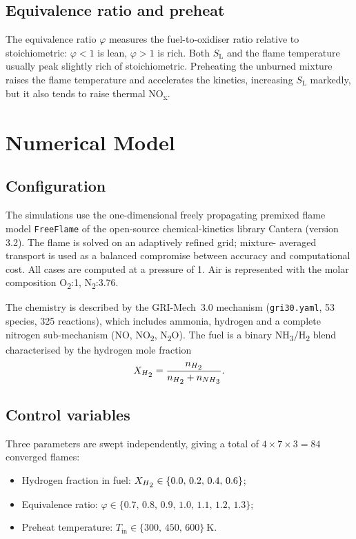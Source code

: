 \documentclass[12pt,a4paper]{article}
\newcommand{\NHH}{NH\textsubscript{3}}
\newcommand{\HH}{H\textsubscript{2}}
\newcommand{\OO}{O\textsubscript{2}}
\newcommand{\NN}{N\textsubscript{2}}
\newcommand{\NO}{NO}
\newcommand{\NOx}{NO\textsubscript{x}}
\newcommand{\NOO}{NO\textsubscript{2}}
\newcommand{\NNO}{N\textsubscript{2}O}
\newcommand{\SL}{$S_\mathrm{L}$}
\newcommand{\phieq}{\varphi}
\begin{document}
\subsection{Equivalence ratio and preheat}
The equivalence ratio $\phieq$ measures the fuel-to-oxidiser ratio relative to
stoichiometric: $\phieq<1$ is lean, $\phieq>1$ is rich. Both \SL{} and the
flame temperature usually peak slightly rich of stoichiometric. Preheating the
unburned mixture raises the flame temperature and accelerates the kinetics,
increasing \SL{} markedly, but it also tends to raise thermal \NOx{}.

\section{Numerical Model}

\subsection{Configuration}
The simulations use the one-dimensional freely propagating premixed flame model
\texttt{FreeFlame} of the open-source chemical-kinetics library Cantera
(version 3.2). The flame is solved on an adaptively refined grid; mixture-%
averaged transport is used as a balanced compromise between accuracy and
computational cost. All cases are computed at a pressure of \SI{1}{\atm}. Air is
represented with the molar composition \OO{}:1, \NN{}:3.76.

The chemistry is described by the GRI-Mech~3.0 mechanism
(\texttt{gri30.yaml}, 53 species, 325 reactions), which includes ammonia,
hydrogen and a complete nitrogen sub-mechanism (\NO{}, \NOO{}, \NNO{}). The fuel
is a binary \NHH{}/\HH{} blend characterised by the hydrogen mole fraction
\begin{equation}
X_{\HH} = \frac{n_{\HH}}{n_{\HH} + n_{\NHH}}.
\end{equation}

\subsection{Control variables}
Three parameters are swept independently, giving a total of $4\times7\times3=84$
converged flames:
\begin{itemize}
  \item Hydrogen fraction in fuel: $X_{\HH}\in\{0.0,\,0.2,\,0.4,\,0.6\}$;
  \item Equivalence ratio: $\phieq\in\{0.7,\,0.8,\,0.9,\,1.0,\,1.1,\,1.2,\,1.3\}$;
  \item Preheat temperature: $T_\mathrm{in}\in\{300,\,450,\,600\}~\si{\kelvin}$.
\end{itemize}
\end{document}
